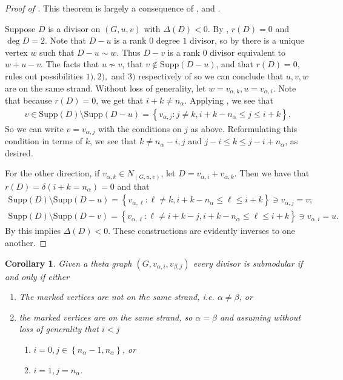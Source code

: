 \documentclass[11pt]{article}
\newtheorem{coro}[theo]{Corollary}
\theoremstyle{definition}
\numberwithin{equation}{section}
\newcommand{\Supp}{\mathrm{Supp}}
\newcommand{\set}[1]{\left\{{#1}\right\}}
\begin{document}
\begin{proof}[Proof of ]
This theorem is largely a consequence of , and .

Suppose $D$ is a divisor on $(G,u,v)$ with $\Delta(D)<0$. By , $r(D) = 0$ and $\deg D  = 2$. Note that $D-u$ is a rank $0$ degree $1$ divisor, so by  there is a unique vertex $w$ such that $D-u\sim w$. Thus $D-v$ is a rank $0$ divisor equivalent to $w+u-v$. The facts that $u \not \sim v$, that $v \not \in \Supp(D-u)$, and that $r(D) = 0$, rules out possibilities $1),2),$ and $3)$ respectively of  so we can conclude that $u,v,w$ are on the same strand. Without loss of generality, let $w = v_{\alpha,k}, u = v_{\alpha,i}$. Note that because $r(D) = 0$, we get that $i+k \neq n_\alpha$. Applying , we see that
\begin{align*}
    v \in \Supp(D)\setminus \Supp(D-u) = \set{v_{\alpha,j}:j \neq k,i+k-n_\alpha \leq j\leq i+k}.
\end{align*}
So we can write $v = v_{\alpha,j}$ with the conditions on $j$ as above. Reformulating this condition in terms of $k$, we see that $k \neq n_\alpha-i,j$ and $j-i\leq k \leq j-i+n_\alpha$, as desired.

For the other direction, if $v_{\alpha,k} \in N_{(G,u,v)}$, let $D = v_{\alpha,i}+v_{\alpha,k}$. Then we have that $r(D) = \delta(i+k = n_\alpha) = 0$ and that
\begin{align*}
    \Supp(D)\setminus\Supp(D-u) = \set{v_{\alpha,\ell}:\ell \neq k,i+k-n_\alpha\leq \ell \leq i+k} \ni v_{\alpha,j} = v;\\
    \Supp(D)\setminus\Supp(D-v) = \set{v_{\alpha,\ell}:\ell \neq i+k-j,i+k-n_\alpha\leq \ell \leq i+k} \ni v_{\alpha,i} = u.
\end{align*}
By  this implies $\Delta(D)<0$. These constructions are evidently inverses to one another.
\end{proof}

\begin{coro}\label{cor-allSubmodSameStrand}
    Given a theta graph $(G,v_{\alpha,i},v_{\beta,j})$ every divisor is submodular if and only if either
    \begin{enumerate}[label = \arabic*)]
        \item The marked vertices are not on the same strand, i.e. $\alpha \neq \beta$, or
        \item the marked vertices are on the same strand, so $\alpha = \beta$ and assuming without loss of generality that $i<j$
        \begin{enumerate}[label = \alph*)]
            \item $i = 0, j \in \set{n_\alpha-1,n_\alpha}$, or
            \item $i = 1, j = n_\alpha$.
        \end{enumerate}
    \end{enumerate}
\end{coro}
\end{document}
